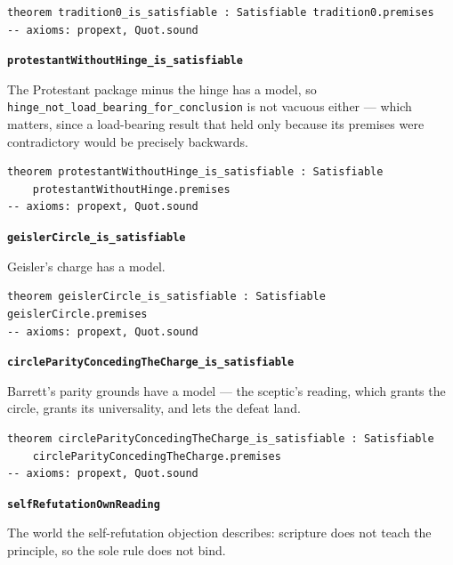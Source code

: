 \documentclass[11pt]{article}
\begin{document}
{\small\begin{verbatim}
theorem tradition0_is_satisfiable : Satisfiable tradition0.premises
-- axioms: propext, Quot.sound
\end{verbatim}}
\par\medskip\noindent\textbf{\texttt{protestant\allowbreak{}Without\allowbreak{}Hinge\_\allowbreak{}is\_\allowbreak{}satisfiable}}\par\nobreak\noindent
The Protestant package minus the hinge has a model, so \texttt{hinge\_\allowbreak{}not\_\allowbreak{}load\_\allowbreak{}bearing\_\allowbreak{}for\_\allowbreak{}conclusion} is not vacuous either — which matters, since a load-bearing result that held only because its premises were contradictory would be precisely backwards.

{\small\begin{verbatim}
theorem protestantWithoutHinge_is_satisfiable : Satisfiable
    protestantWithoutHinge.premises
-- axioms: propext, Quot.sound
\end{verbatim}}
\par\medskip\noindent\textbf{\texttt{geisler\allowbreak{}Circle\_\allowbreak{}is\_\allowbreak{}satisfiable}}\par\nobreak\noindent
Geisler’s charge has a model.

{\small\begin{verbatim}
theorem geislerCircle_is_satisfiable : Satisfiable geislerCircle.premises
-- axioms: propext, Quot.sound
\end{verbatim}}
\par\medskip\noindent\textbf{\texttt{circle\allowbreak{}Parity\allowbreak{}Conceding\allowbreak{}The\allowbreak{}Charge\_\allowbreak{}is\_\allowbreak{}satisfiable}}\par\nobreak\noindent
Barrett’s parity grounds have a model — the sceptic’s reading, which grants the circle, grants its universality, and lets the defeat land.

{\small\begin{verbatim}
theorem circleParityConcedingTheCharge_is_satisfiable : Satisfiable
    circleParityConcedingTheCharge.premises
-- axioms: propext, Quot.sound
\end{verbatim}}
\par\medskip\noindent\textbf{\texttt{self\allowbreak{}Refutation\allowbreak{}Own\allowbreak{}Reading}}\par\nobreak\noindent
The world the self-refutation objection describes: scripture does not teach the principle, so the sole rule does not bind.
\end{document}
